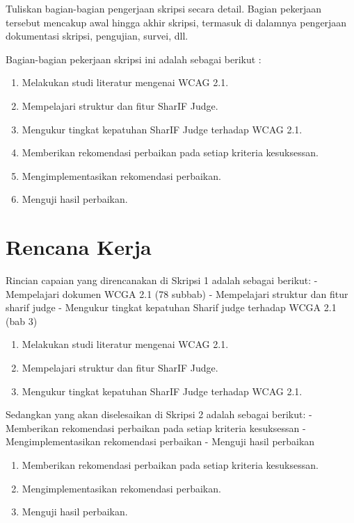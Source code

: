 \documentclass[a4paper,twoside]{article}
\begin{document}
Tuliskan bagian-bagian pengerjaan skripsi secara detail. Bagian pekerjaan tersebut mencakup awal hingga akhir skripsi, termasuk di dalamnya pengerjaan dokumentasi skripsi, pengujian, survei, dll.

Bagian-bagian pekerjaan skripsi ini adalah sebagai berikut :
	\begin{enumerate}
		\item Melakukan studi literatur mengenai WCAG 2.1.
		\item Mempelajari struktur dan fitur SharIF Judge.
		\item Mengukur tingkat kepatuhan SharIF Judge terhadap WCAG 2.1.
		\item Memberikan rekomendasi perbaikan pada setiap kriteria kesuksessan.
		\item Mengimplementasikan rekomendasi perbaikan.
		\item Menguji hasil perbaikan.
	\end{enumerate}

\section{Rencana Kerja}

Rincian capaian yang direncanakan di Skripsi 1 adalah sebagai berikut:
- Mempelajari dokumen WCGA 2.1 (78 subbab)
- Mempelajari struktur dan fitur sharif judge
- Mengukur tingkat kepatuhan Sharif judge terhadap WCGA 2.1 (bab 3)

\begin{enumerate}
	\item Melakukan studi literatur mengenai WCAG 2.1.
	\item Mempelajari struktur dan fitur SharIF Judge.
	\item Mengukur tingkat kepatuhan SharIF Judge terhadap WCAG 2.1.
\end{enumerate}

Sedangkan yang akan diselesaikan di Skripsi 2 adalah sebagai berikut:
- Memberikan rekomendasi perbaikan pada setiap kriteria kesuksessan
- Mengimplementasikan rekomendasi perbaikan
- Menguji hasil perbaikan

\begin{enumerate}
	\item Memberikan rekomendasi perbaikan pada setiap kriteria kesuksessan.
	\item Mengimplementasikan rekomendasi perbaikan.
	\item Menguji hasil perbaikan.
\end{enumerate}
\end{document}
